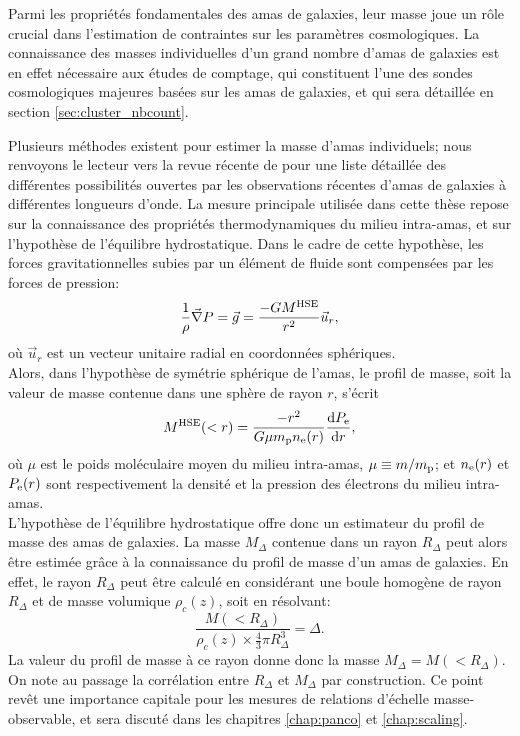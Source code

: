 Parmi les propriétés fondamentales des amas de galaxies, leur masse joue un rôle crucial dans l'estimation de contraintes sur les paramètres cosmologiques.
La connaissance des masses individuelles d'un grand nombre d'amas de galaxies est en effet nécessaire aux études de comptage, qui constituent l'une des sondes cosmologiques majeures basées sur les amas de galaxies, et qui sera détaillée en section \ref{sec:cluster_nbcount}.

Plusieurs méthodes existent pour estimer la masse d'amas individuels; nous renvoyons le lecteur vers la revue récente de  pour une liste détaillée des différentes possibilités ouvertes par les observations récentes d'amas de galaxies à différentes longueurs d'onde.
La mesure principale utilisée dans cette thèse repose sur la connaissance des propriétés thermodynamiques du milieu intra-amas, et sur l'hypothèse de l'équilibre hydrostatique.
Dans le cadre de cette hypothèse, les forces gravitationnelles subies par un élément de fluide sont compensées par les forces de pression:
\begin{equation}
    \frac{1}{\rho} \vec{\nabla} P = \vec{g} = \frac{-G M^{\rm HSE}}{r^2} \vec{u}_r,
\end{equation}
où $\vec{u}_r$ est un vecteur unitaire radial en coordonnées sphériques. \\
Alors, dans l'hypothèse de symétrie sphérique de l'amas, le profil de masse, soit la valeur de masse contenue dans une sphère de rayon $r$, s'écrit
\begin{equation}
    \label{eq:mhse}
    M^{\rm HSE}(<r) = \frac{-r^2}{G \mu m_{\rm p} n_{\rm e}(r)} \frac{\mathrm{d} P_{\rm e}}{\mathrm{d} r},
\end{equation}
où $\mu$ est le poids moléculaire moyen du milieu intra-amas, $\mu \equiv m/m_{\rm p}$; et $n_{\rm e}(r)$ et $P_{\rm e}(r)$ sont respectivement la densité et la pression des électrons du milieu intra-amas. \\
L'hypothèse de l'équilibre hydrostatique offre donc un estimateur du profil de masse des amas de galaxies.
La masse $M_\Delta$ contenue dans un rayon $R_\Delta$ peut alors être estimée grâce à la connaissance du profil de masse d'un amas de galaxies.
En effet, le rayon $R_\Delta$ peut être calculé en considérant une boule homogène de rayon $R_\Delta$ et de masse volumique $\rho_c(z)$, soit en résolvant:
\begin{equation}
    \label{eq:r_delta_from_m}
    \frac{M(<R_\Delta)}{\rho_c(z) \times \frac{4}{3} \pi R_\Delta^3} = \Delta.
\end{equation}
La valeur du profil de masse à ce rayon donne donc la masse $M_\Delta = M(<R_\Delta)$.
On note au passage la corrélation entre $R_\Delta$ et $M_\Delta$ par construction. Ce point revêt une importance capitale pour les mesures de relations d'échelle masse-observable, et sera discuté dans les chapitres \ref{chap:panco} et \ref{chap:scaling}.

